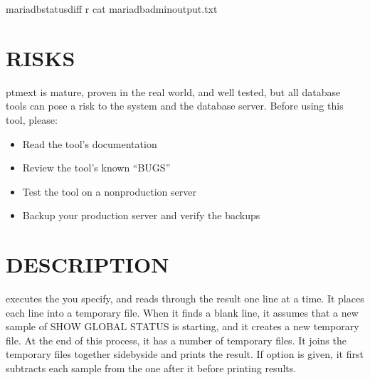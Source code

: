 \documentclass[letterpaper,10pt,english]{sphinxmanual}
\begin{document}
\begin{sphinxVerbatim}[commandchars=\\\{\}]
mariadb\PYGZhy{}status\PYGZhy{}diff \PYGZhy{}r \PYGZhy{}\PYGZhy{} cat mariadb\PYGZhy{}admin\PYGZhy{}output.txt
\end{sphinxVerbatim}


\section{RISKS}
\label{\detokenize{mariadb-status-diff:risks}}
\sphinxAtStartPar
pt\sphinxhyphen{}mext is mature, proven in the real world, and well tested,
but all database tools can pose a risk to the system and the database
server.  Before using this tool, please:
\begin{itemize}
\item {} 
\sphinxAtStartPar
Read the tool’s documentation

\item {} 
\sphinxAtStartPar
Review the tool’s known “BUGS”

\item {} 
\sphinxAtStartPar
Test the tool on a non\sphinxhyphen{}production server

\item {} 
\sphinxAtStartPar
Backup your production server and verify the backups

\end{itemize}


\section{DESCRIPTION}
\label{\detokenize{mariadb-status-diff:description}}
\sphinxAtStartPar
{} executes the  you specify, and reads through the result one
line at a time.  It places each line into a temporary file.  When it finds a
blank line, it assumes that a new sample of SHOW GLOBAL STATUS is starting,
and it creates a new temporary file.  At the end of this process, it has a
number of temporary files.  It joins the temporary files together side\sphinxhyphen{}by\sphinxhyphen{}side
and prints the result.  If {\hyperref[\detokenize{mariadb-status-diff:cmdoption-mariadb-status-diff-relative}]{}} option is given, it first subtracts
each sample from the one after it before printing results.
\end{document}
